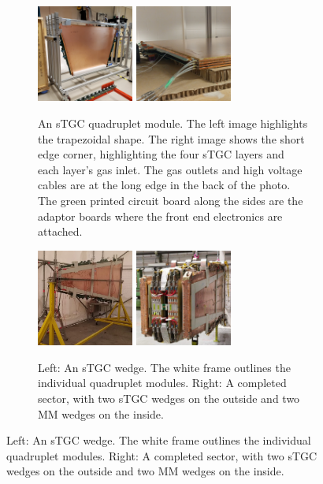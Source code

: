 \begin{figure}
\centering
\begin{subfigure}{\textwidth}
  \centering
  \includegraphics[width=0.35\textwidth]{figures/stgc_quad_cart.jpg}
  \includegraphics[width=0.35\textwidth]{figures/stgc_quad_inlet_corner.jpg}
  \caption{An sTGC quadruplet module. The left image highlights the trapezoidal shape. The right image shows the short edge corner, highlighting the four sTGC layers and each layer's gas inlet. The gas outlets and high voltage cables are at the long edge in the back of the photo. The green printed circuit board along the sides are the adaptor boards where the front end electronics are attached.}
  \label{fig:stgc_quad}
\end{subfigure}

\smallskip

\begin{subfigure}{\textwidth}
  \centering
  \includegraphics[width=0.35\textwidth]{figures/stgc_wedge.jpg}
  \includegraphics[width=0.35\textwidth]{figures/sector.jpg}
  \caption{Left: An sTGC wedge. The white frame outlines the individual quadruplet modules. Right: A completed sector, with two sTGC wedges on the outside and two MM wedges on the inside.}
  \label{fig:wedge_and_sector}
\end{subfigure}


\end{figure}
